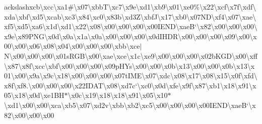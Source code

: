 \begin{DoxyCompactItemize}
ackslash{}xcb\textbackslash{}xcc\textbackslash{}xa1\#\textbackslash{}x07\textbackslash{}xbb\+T\textbackslash{}xc7\textbackslash{}x9e\textbackslash{}xd1\textbackslash{}xb9\textbackslash{}x01\textbackslash{}xe0\%\textbackslash{}x22\textbackslash{}xcf\textbackslash{}x7f\textbackslash{}xdf\textbackslash{}xda\textbackslash{}xbf\textbackslash{}xd5\textbackslash{}xcab\textbackslash{}xc3\textbackslash{}x84\textbackslash{}xc0\textbackslash{}x83b\textbackslash{}xd3\+Z\textbackslash{}xbf\+J\textbackslash{}x17\textbackslash{}xb0\textbackslash{}x07\+N\+D\textbackslash{}xf4\textbackslash{}x07\textbackslash{}xae\textbackslash{}xf5\textbackslash{}xd5\textbackslash{}xa6\textbackslash{}x1d\textbackslash{}xd1\textbackslash{}x22\textbackslash{}x08\textbackslash{}x00\textbackslash{}x00\textbackslash{}x00\textbackslash{}x00\+I\+E\+N\+D\textbackslash{}xae\+B`\textbackslash{}x82\textbackslash{}x00\textbackslash{}x00\textbackslash{}x00\textbackslash{}x9e\textbackslash{}x89\+P\+N\+G\textbackslash{}x0d\textbackslash{}x0a\textbackslash{}x1a\textbackslash{}x0a\textbackslash{}x00\textbackslash{}x00\textbackslash{}x00\textbackslash{}x0d\+I\+H\+D\+R\textbackslash{}x00\textbackslash{}x00\textbackslash{}x00\textbackslash{}x09\textbackslash{}x00\textbackslash{}x00\textbackslash{}x00\textbackslash{}x06\textbackslash{}x08\textbackslash{}x04\textbackslash{}x00\textbackslash{}x00\textbackslash{}x00\textbackslash{}xbb\textbackslash{}xce$\vert$\+N\textbackslash{}x00\textbackslash{}x00\textbackslash{}x00\textbackslash{}x01s\+R\+G\+B\textbackslash{}x00\textbackslash{}xae\textbackslash{}xce\textbackslash{}x1c\textbackslash{}xe9\textbackslash{}x00\textbackslash{}x00\textbackslash{}x00\textbackslash{}x02b\+K\+G\+D\textbackslash{}x00\textbackslash{}xff\textbackslash{}x87\textbackslash{}x8f\textbackslash{}xcc\textbackslash{}xbf\textbackslash{}x00\textbackslash{}x00\textbackslash{}x00\textbackslash{}x09p\+H\+Ys\textbackslash{}x00\textbackslash{}x00\textbackslash{}x0b\textbackslash{}x13\textbackslash{}x00\textbackslash{}x00\textbackslash{}x0b\textbackslash{}x13\textbackslash{}x01\textbackslash{}x00\textbackslash{}x9a\textbackslash{}x9c\textbackslash{}x18\textbackslash{}x00\textbackslash{}x00\textbackslash{}x00\textbackslash{}x07t\+I\+M\+E\textbackslash{}x07\textbackslash{}xdc\textbackslash{}x08\textbackslash{}x17\textbackslash{}x08\textbackslash{}x15\textbackslash{}x0f\textbackslash{}xfd\textbackslash{}x8f\textbackslash{}xf8.\textbackslash{}x00\textbackslash{}x00\textbackslash{}x00\textbackslash{}x22\+I\+D\+A\+T\textbackslash{}x08\textbackslash{}xd7c`\textbackslash{}xc0\textbackslash{}x0d\textbackslash{}xfe\textbackslash{}x9f\textbackslash{}x87\textbackslash{}xb1\textbackslash{}x18\textbackslash{}x91\textbackslash{}x05\textbackslash{}x18\textbackslash{}x0d\textbackslash{}xe1\+B\+H$\ast$\textbackslash{}x0c\textbackslash{}x19\textbackslash{}x18\textbackslash{}x18\textbackslash{}x91\textbackslash{}x05\textbackslash{}x10$\ast$\textbackslash{}xd1\textbackslash{}x00\textbackslash{}x00\textbackslash{}xca\textbackslash{}xb5\textbackslash{}x07\textbackslash{}xd2v\textbackslash{}xbb\textbackslash{}xb2\textbackslash{}xc5\textbackslash{}x00\textbackslash{}x00\textbackslash{}x00\textbackslash{}x00\+I\+E\+N\+D\textbackslash{}xae\+B`\textbackslash{}x82\textbackslash{}x00\textbackslash{}x00\textbackslash{}x00\text
\end{DoxyCompactItemize}
